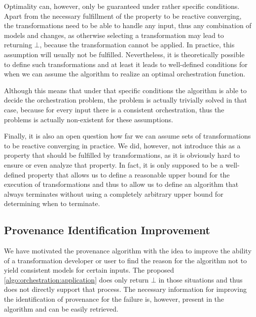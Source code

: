 Optimality can, however, only be guaranteed under rather specific conditions.
Apart from the necessary fulfillment of the property to be reactive converging, the transformations need to be able to handle any input, thus any combination of models and changes, as otherwise selecting a transformation may lead to  returning $\bot$, because the transformation cannot be applied.
In practice, this assumption will usually not be fulfilled.
Nevertheless, it is theoretically possible to define such transformations and at least it leads to well-defined conditions for when we can assume the algorithm to realize an optimal orchestration function.

Although this means that under that specific conditions the algorithm is able to decide the orchestration problem, the problem is actually trivially solved in that case, because for every input there is a consistent orchestration, thus the problems is actually non-existent for these assumptions.

Finally, it is also an open question how far we can assume sets of transformations to be reactive converging in practice.
We did, however, not introduce this as a property that should be fulfilled by transformations, as it is obviously hard to ensure or even analyze that property.
In fact, it is only supposed to be a well-defined property that allows us to define a reasonable upper bound for the execution of transformations and thus to allow us to define an algorithm that always terminates without using a completely arbitrary upper bound for determining when to terminate.


\subsection{Provenance Identification Improvement}

We have motivated the provenance algorithm with the idea to improve the ability of a transformation developer or user to find the reason for the algorithm not to yield consistent models for certain inputs.
The proposed \autoref{algo:orchestration:application} does only return $\bot$ in those situations and thus does not directly support that process.
The necessary information for improving the identification of provenance for the failure is, however, present in the algorithm and can be easily retrieved.

